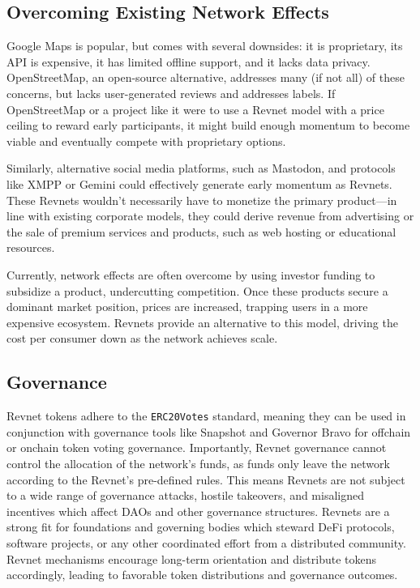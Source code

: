 \documentclass{article}
\begin{document}
\subsection{Overcoming Existing Network Effects}

Google Maps is popular, but comes with several downsides: it is proprietary, its API is expensive, it has limited offline support, and it lacks data privacy. OpenStreetMap, an open-source alternative, addresses many (if not all) of these concerns, but lacks user-generated reviews and addresses labels. If OpenStreetMap or a project like it were to use a Revnet model with a price ceiling to reward early participants, it might build enough momentum to become viable and eventually compete with proprietary options.

Similarly, alternative social media platforms, such as Mastodon, and protocols like XMPP or Gemini could effectively generate early momentum as Revnets. These Revnets wouldn't necessarily have to monetize the primary product---in line with existing corporate models, they could derive revenue from advertising or the sale of premium services and products, such as web hosting or educational resources. 

Currently, network effects are often overcome by using investor funding to subsidize a product, undercutting competition. Once these products secure a dominant market position, prices are increased, trapping users in a more expensive ecosystem. Revnets provide an alternative to this model, driving the cost per consumer down as the network achieves scale.

\subsection{Governance}

Revnet tokens adhere to the \texttt{ERC20Votes} standard, meaning they can be used in conjunction with governance tools like Snapshot and Governor Bravo for offchain or onchain token voting governance. Importantly, Revnet governance cannot control the allocation of the network's funds, as funds only leave the network according to the Revnet's pre-defined rules. This means Revnets are not subject to a wide range of governance attacks, hostile takeovers, and misaligned incentives which affect DAOs and other governance structures. Revnets are a strong fit for foundations and governing bodies which steward DeFi protocols, software projects, or any other coordinated effort from a distributed community. Revnet mechanisms encourage long-term orientation and distribute tokens accordingly, leading to favorable token distributions and governance outcomes.
\end{document}

